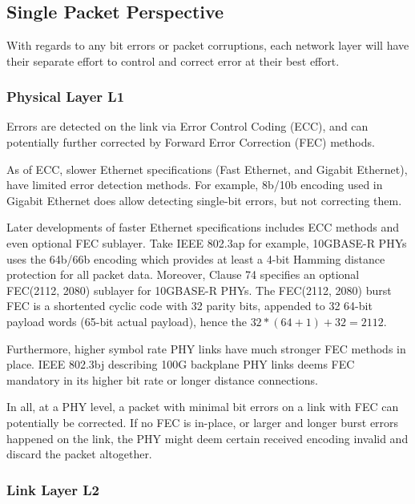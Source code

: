 \documentclass[12pt,letterpaper]{article}
\begin{document}
\section{}

\subsection{Single Packet Perspective}

With regards to any bit errors or packet corruptions, each network layer will have their separate effort to control and correct error at their best effort.

\subsubsection{Physical Layer L1}

Errors are detected on the link via Error Control Coding (ECC), and can potentially further corrected by Forward Error Correction (FEC) methods. 

As of ECC, slower Ethernet specifications (Fast Ethernet, and Gigabit Ethernet), have limited error detection methods. For example, 8b/10b encoding used in Gigabit Ethernet does allow detecting single-bit errors, but not correcting them. 

Later developments of faster Ethernet specifications includes ECC methods and even optional FEC sublayer. Take IEEE 802.3ap for example, 10GBASE-R PHYs uses the 64b/66b encoding which provides at least a 4-bit Hamming distance protection for all packet data. Moreover, Clause 74 specifies an optional FEC(2112, 2080) sublayer for 10GBASE-R PHYs. The FEC(2112, 2080) burst FEC is a shortented cyclic code with 32 parity bits, appended to 32 64-bit payload words (65-bit actual payload), hence the $32*(64 + 1) + 32 = 2112$.

Furthermore, higher symbol rate PHY links have much stronger FEC methods in place. IEEE 802.3bj describing 100G backplane PHY links deems FEC mandatory in its higher bit rate or longer distance connections.

In all, at a PHY level, a packet with minimal bit errors on a link with FEC can potentially be corrected. If no FEC is in-place, or larger and longer burst errors happened on the link, the PHY might deem certain received encoding invalid and discard the packet altogether.

\subsubsection{Link Layer L2}
\end{document}
